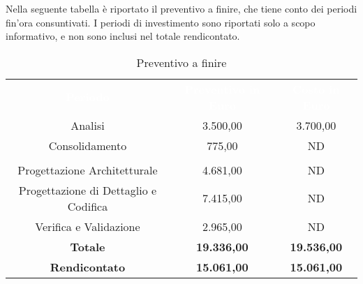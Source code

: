 Nella seguente tabella è riportato il preventivo a finire, che tiene conto dei periodi fin'ora consuntivati. I periodi di investimento sono riportati solo a scopo informativo, e non sono inclusi nel totale rendicontato.

\begin{table}[H]
	\centering
	\begin{tabular}{ccc}
	\rowcolor{greySWEight}
	\textcolor{white}{\textbf{Periodo}} &
	\textcolor{white}{\textbf{Preventivo in Euro}} & 
	\textcolor{white}{\textbf{Costo in Euro}} \\
	Analisi & 3.500,00 & 3.700,00 \\
	Consolidamento & 775,00 & ND \\
	\rowcolor{greySWEight}
	\multicolumn{3}{c}{ \textcolor{white}{\textbf{Rendicontato}} } \\
	Progettazione Architetturale & 4.681,00 & ND \\
	Progettazione di Dettaglio e Codifica & 7.415,00 & ND \\
	Verifica e Validazione & 2.965,00 & ND \\
	\hline	
	\textbf{Totale} & \textbf{19.336,00} & \textbf{19.536,00} \\
	\textbf{Rendicontato} & \textbf{15.061,00} & \textbf{15.061,00} \\
	\end{tabular}
	\caption{Preventivo a finire}
\end{table}
